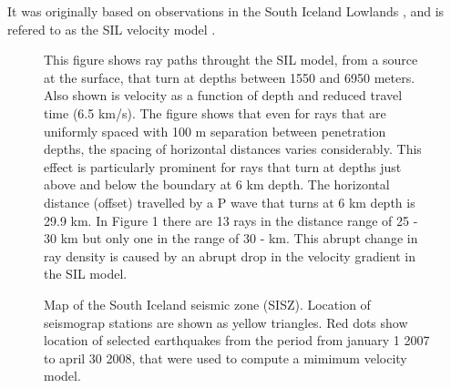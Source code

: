 \documentclass[extra]{gji}
\begin{document}
It was originally based on
observations in the South Iceland Lowlands \citep{ib93}, and is refered to as the
SIL velocity 
model \citep{rs93}.

\begin{figure}
\caption{This figure shows ray paths throught the SIL model, from a source at
the surface, that turn at depths between 1550 and 6950 meters. Also
shown is velocity as a function of depth and reduced travel time (6.5
km/s). The figure shows that even for rays that are uniformly spaced
with 100 m separation between penetration depths, the spacing of
horizontal distances varies considerably. This effect is particularly
prominent for rays that turn at depths just above and below the
boundary at 6 km depth. The horizontal distance (offset) travelled by
a P wave that turns at 6 km depth is 29.9 km. In Figure 1 there are 13
rays in the distance range of 25 - 30 km but only one in the range of
30 - km. This abrupt change in ray density is caused by an abrupt
drop in the velocity gradient in the SIL model.
	}
\end{figure}
\begin{figure}
	\caption{
Map of the South Iceland seismic zone (SISZ). Location of seismograp stations are shown as yellow triangles. Red dots show location of selected
earthquakes from the period from january 1 2007 to april 30 2008, that were 
used to compute a mimimum velocity model.
		}
\end{figure}
\end{document}
